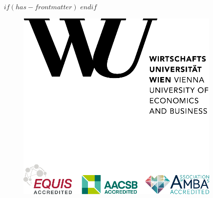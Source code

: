 $if(has-frontmatter)$
\frontmatter
$endif$


\thispagestyle{empty}
\begin{figure}[h!]
    \raggedleft
    \includegraphics[scale=0.9]{pictures/WULogo.png}
\end{figure}

\vspace{1em}

